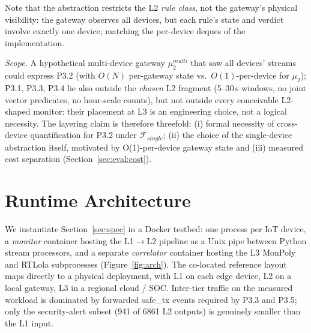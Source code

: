 \documentclass[runningheads]{llncs}
\begin{document}
\noindent Note that the abstraction restricts the L2 \emph{rule class}, not the gateway's physical visibility: the gateway observes all devices, but each rule's state and verdict involve exactly one device, matching the per-device deques of the implementation.

\noindent\emph{Scope.}  A hypothetical multi-device gateway
$\mu_2^{\mathit{multi}}$ that saw all devices' streams could
express P3.2 (with $O(N)$ per-gateway state vs.\ $O(1)$-per-device
for $\mu_2$); P3.1, P3.3, P3.4 lie also outside the
\emph{chosen} L2 fragment (5--30\,s windows, no joint vector
predicates, no hour-scale counts), but not outside every conceivable L2-shaped monitor: their placement at L3 is an engineering choice,
not a logical necessity.
The layering claim is therefore threefold: (i) formal necessity of
cross-device quantification for P3.2 under
$\mathcal{F}_{\mathit{single}}$;  (ii) the choice of the single-device abstraction itself, motivated by
O(1)-per-device gateway state
 and (iii) measured cost
separation (Section~\ref{sec:eval:cost}).


\section{Runtime Architecture}
\label{sec:arch}

 
We instantiate Section~\ref{sec:spec} in a Docker testbed: one process per
IoT device, a \emph{monitor} container hosting the L1$\to$L2 pipeline as a
Unix pipe between Python stream processors, and a separate \emph{correlator} container hosting the L3 MonPoly and RTLola subprocesses (Figure~\ref{fig:arch}).
 The co-located reference layout maps directly to a physical
deployment, with L1 on each edge device, L2 on a local gateway, L3
in a regional cloud / SOC.  Inter-tier traffic on the measured
workload is dominated by forwarded \textsf{safe\_tx} events
required by P3.3 and P3.5; only the security-alert subset
(941 of 6861 L2 outputs) is
genuinely smaller than the L1 input.
\end{document}
